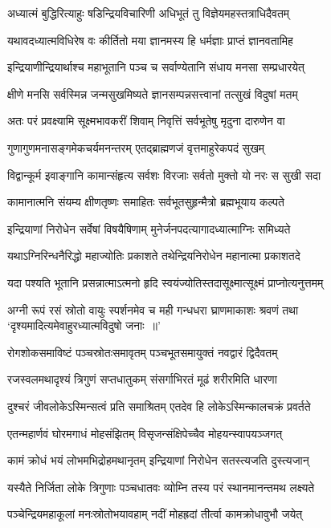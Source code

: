 \twolineshloka
{अध्यात्मं बुद्धिरित्याहुः षडिन्द्रियविचारिणी}
{अधिभूतं तु विज्ञेयमहस्तत्राधिदैवतम्}


\twolineshloka
{यथावदध्यात्मविधिरेष वः कीर्तितो मया}
{ज्ञानमस्य हि धर्मज्ञाः प्राप्तं ज्ञानवतामिह}


\twolineshloka
{इन्द्रियाणीन्द्रियार्थाश्च महाभूतानि पञ्च च}
{सर्वाण्येतानि संधाय मनसा सम्प्रधारयेत्}


\twolineshloka
{क्षीणे मनसि सर्वस्मिन्न जन्मसुखमिष्यते}
{ज्ञानसम्पन्नसत्त्वानां तत्सुखं विदुषां मतम्}


\twolineshloka
{अतः परं प्रवक्ष्यामि सूक्ष्मभावकरीं शिवाम्}
{निवृत्तिं सर्वभूतेषु मृदुना दारुणेन वा}


\twolineshloka
{गुणागुणमनासङ्गमेकचर्यमनन्तरम्}
{एतद्ब्राह्मणजं वृत्तमाहुरेकपदं सुखम्}


\twolineshloka
{विद्वान्कूर्म इवाङ्गानि कामान्संहृत्य सर्वशः}
{विरजाः सर्वतो मुक्तो यो नरः स सुखी सदा}


\twolineshloka
{कामानात्मनि संयम्य क्षीणतृष्णः समाहितः}
{सर्वभूतसुहृन्मैत्रो ब्रह्मभूयाय कल्पते}


\twolineshloka
{इन्द्रियाणां निरोधेन सर्वेषां विषयैषिणाम्}
{मुनेर्जनपदत्यागादध्यात्माग्निः समिध्यते}


\twolineshloka
{यथाऽग्निरिन्धनैरिद्धो महाज्योतिः प्रकाशते}
{तथेन्द्रियनिरोधेन महानात्मा प्रकाशतदे}


\twolineshloka
{यदा पश्यति भूतानि प्रसन्नात्माऽत्मनो हृदि}
{स्वयंज्योतिस्तदासूक्ष्मात्सूक्ष्मं प्राप्नोत्यनुत्तमम्}


\threelineshloka
{अग्नी रूपं रसं स्रोतो वायुः स्पर्शनमेव च}
{मही गन्धधरा घ्राणमाकाशः श्रवणं तथा}
{`दृश्यमादित्यमेवाहुरध्यात्मविदुषो जनाः ॥'}


\twolineshloka
{रोगशोकसमाविष्टं पञ्चस्रोतःसमावृतम्}
{पञ्चभूतसमायुक्तं नवद्वारं द्विदैवतम्}


\twolineshloka
{रजस्वलमथादृश्यं त्रिगुणं सप्तधातुकम्}
{संसर्गाभिरतं मूढं शरीरमिति धारणा}


\twolineshloka
{दुश्चरं जीवलोकेऽस्मिन्सत्वं प्रति समाश्रितम्}
{एतदेव हि लोकेऽस्मिन्कालचक्रं प्रवर्तते}


\twolineshloka
{एतन्महार्णवं घोरमगाधं मोहसंझितम्}
{विसृजन्संक्षिपेच्चैव मोहयन्स्वापयञ्जगत्}


\twolineshloka
{कामं क्रोधं भयं लोभमभिद्रोहमथानृतम्}
{इन्द्रियाणां निरोधेन सतस्त्यजति दुस्त्यजान्}


\twolineshloka
{यस्यैते निर्जिता लोके त्रिगुणाः पञ्चधातवः}
{व्योम्नि तस्य परं स्थानमानन्तमथ लक्ष्यते}


\twolineshloka
{पञ्चेन्द्रियमहाकूलां मनःस्रोतोभयावहाम्}
{नदीं मोहह्रदां तीर्त्वा कामक्रोधावुभौ जयेत्}


